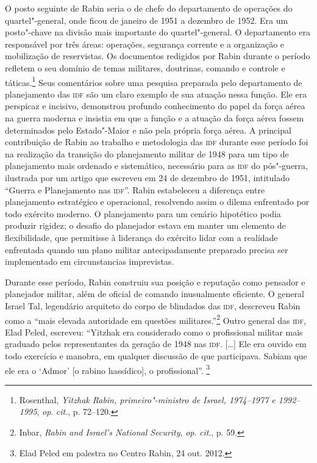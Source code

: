 O posto seguinte de Rabin seria o de chefe do departamento de operações
do quartel"-general, onde ficou de janeiro de 1951 a dezembro de 1952.
Era um posto"-chave na divisão mais importante do quartel"-general. O
departamento era responsável por três áreas: operações, segurança
corrente e a organização e mobilização de reservistas. Os documentos
redigidos por Rabin durante o período refletem o seu domínio de temas
militares, doutrinas, comando e controle e táticas.\footnote{Rosenthal, \emph{Yitzhak Rabin, primeiro"-ministro de Israel, 1974--1977 e 1992--1995}, \emph{op}. \emph{cit}., p. 72--120.} Seus
comentários sobre uma pesquisa preparada pelo departamento de
planejamento das \textsc{idf} são um claro exemplo de sua atuação nessa função.
Ele era perspicaz e incisivo, demonstrou profundo conhecimento do
papel da força aérea na guerra moderna e insistia em que a função e a
atuação da força aérea fossem determinados pelo Estado"-Maior e não pela
própria força aérea. A principal contribuição de Rabin ao trabalho e
metodologia das \textsc{idf} durante esse período foi na realização da transição
do planejamento militar de 1948 para um tipo de planejamento mais
ordenado e sistemático, necessário para as \textsc{idf} do pós"-guerra, ilustrada
por um artigo que escreveu em 24 de dezembro de 1951, intitulado ``Guerra e
Planejamento nas \textsc{idf}''. Rabin estabeleceu a diferença entre planejamento
estratégico e operacional, resolvendo assim o dilema enfrentado por todo
exército moderno. O planejamento para um cenário hipotético podia
produzir rigidez; o desafio do planejador estava em manter um elemento
de flexibilidade, que permitisse à liderança do exército lidar com a
realidade enfrentada quando um plano militar antecipadamente preparado
precisa ser implementado em circunstancias imprevistas.

Durante esse período, Rabin construiu sua posição e reputação como
pensador e planejador militar, além de oficial de comando inusualmente
eficiente. O general Israel Tal, legendário arquiteto do corpo de
blindados das \textsc{idf}, descreveu Rabin como a ``mais elevada autoridade em
questões militares.''\footnote{Inbar, \emph{Rabin and Israel's National Security}, \emph{op}. \emph{cit}., p. 59.} Outro general das \textsc{idf}, Elad Peled,
escreveu: ``Yitzhak era considerado como o profissional militar mais
graduado pelos representantes da geração de 1948 nas \textsc{idf}. {[}\ldots{}{]} Ele era
ouvido em todo exercício e manobra, em qualquer discussão de que
participava. Sabiam que ele era o `Admor' {[}o rabino hassídico{]}, o
profissional''. \footnote{Elad Peled em palestra no Centro Rabin, 24 out. 2012.}

